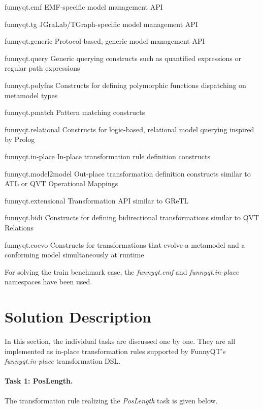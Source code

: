 \documentclass[submission]{eptcs}
\begin{document}
\begin{compactdesc}
\item[funnyqt.emf] EMF-specific model management API
\item[funnyqt.tg] JGraLab/TGraph-specific model management API
\item[funnyqt.generic] Protocol-based, generic model management API
\item[funnyqt.query] Generic querying constructs such as quantified expressions
  or regular path expressions
\item[funnyqt.polyfns] Constructs for defining polymorphic functions
  dispatching on metamodel types
\item[funnyqt.pmatch] Pattern matching constructs
\item[funnyqt.relational] Constructs for logic-based, relational model querying
  inspired by Prolog
\item[funnyqt.in-place] In-place transformation rule definition constructs
\item[funnyqt.model2model] Out-place transformation definition constructs
  similar to ATL or QVT Operational Mappings
\item[funnyqt.extensional] Transformation API similar to GReTL
\item[funnyqt.bidi] Constructs for defining bidirectional transformations
  similar to QVT Relations
\item[funnyqt.coevo] Constructs for transformations that evolve a metamodel and
  a conforming model simultaneously at runtime
\end{compactdesc}

For solving the train benchmark case, the \emph{funnyqt.emf} and
\emph{funnyqt.in-place} namespaces have been used.


\section{Solution Description}
\label{sec:solution-description}

In this section, the individual tasks are discussed one by one.  They are all
implemented as in-place transformation rules supported by FunnyQT's
\emph{funnyqt.in-place} transformation DSL.

\paragraph{Task 1: PosLength.}

The transformation rule realizing the \emph{PosLength} task is given below.
\end{document}
